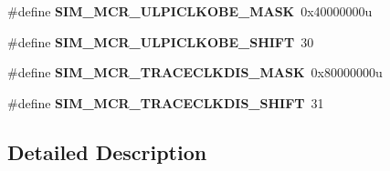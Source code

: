 \begin{DoxyCompactItemize}
\item 
\hypertarget{group___s_i_m___register___masks_ga810f5e7a0ea3cbda95c0d9ceb8956583}{}\#define {\bfseries S\+I\+M\+\_\+\+M\+C\+R\+\_\+\+U\+L\+P\+I\+C\+L\+K\+O\+B\+E\+\_\+\+M\+A\+S\+K}~0x40000000u\label{group___s_i_m___register___masks_ga810f5e7a0ea3cbda95c0d9ceb8956583}

\item 
\hypertarget{group___s_i_m___register___masks_ga147685204b23d8a1b9c296222df77d40}{}\#define {\bfseries S\+I\+M\+\_\+\+M\+C\+R\+\_\+\+U\+L\+P\+I\+C\+L\+K\+O\+B\+E\+\_\+\+S\+H\+I\+F\+T}~30\label{group___s_i_m___register___masks_ga147685204b23d8a1b9c296222df77d40}

\item 
\hypertarget{group___s_i_m___register___masks_ga47401076d5a38142f7f0a9c4737d92e8}{}\#define {\bfseries S\+I\+M\+\_\+\+M\+C\+R\+\_\+\+T\+R\+A\+C\+E\+C\+L\+K\+D\+I\+S\+\_\+\+M\+A\+S\+K}~0x80000000u\label{group___s_i_m___register___masks_ga47401076d5a38142f7f0a9c4737d92e8}

\item 
\hypertarget{group___s_i_m___register___masks_ga3c9422317cc5260423b0a838f55f2129}{}\#define {\bfseries S\+I\+M\+\_\+\+M\+C\+R\+\_\+\+T\+R\+A\+C\+E\+C\+L\+K\+D\+I\+S\+\_\+\+S\+H\+I\+F\+T}~31\label{group___s_i_m___register___masks_ga3c9422317cc5260423b0a838f55f2129}

\end{DoxyCompactItemize}


\subsection{Detailed Description}
